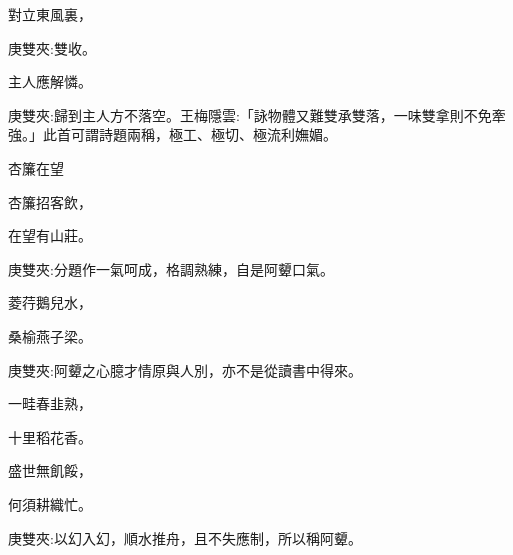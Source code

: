 \begin{poem}
    \begin{pl}對立東風裏，\end{pl}\begin{note}庚雙夾:雙收。\end{note}

    \begin{pl}主人應解憐。\end{pl}\begin{note}庚雙夾:歸到主人方不落空。王梅隱雲:「詠物體又難雙承雙落，一味雙拿則不免牽強。」此首可謂詩題兩稱，極工、極切、極流利嫵媚。\end{note}
\end{poem}


\begin{poem}
    \begin{pl}杏簾在望\end{pl}

    \begin{pl}杏簾招客飲，\end{pl}

    \begin{pl}在望有山莊。\end{pl}\begin{note}庚雙夾:分題作一氣呵成，格調熟練，自是阿顰口氣。\end{note}

    \begin{pl}菱荇鵝兒水，\end{pl}

    \begin{pl}桑榆燕子梁。\end{pl}\begin{note}庚雙夾:阿顰之心臆才情原與人別，亦不是從讀書中得來。\end{note}

    \begin{pl}一畦春韭熟，\end{pl}

    \begin{pl}十里稻花香。\end{pl}

    \begin{pl}盛世無飢餒，\end{pl}

    \begin{pl}何須耕織忙。\end{pl}\begin{note}庚雙夾:以幻入幻，順水推舟，且不失應制，所以稱阿顰。\end{note}

\end{poem}



